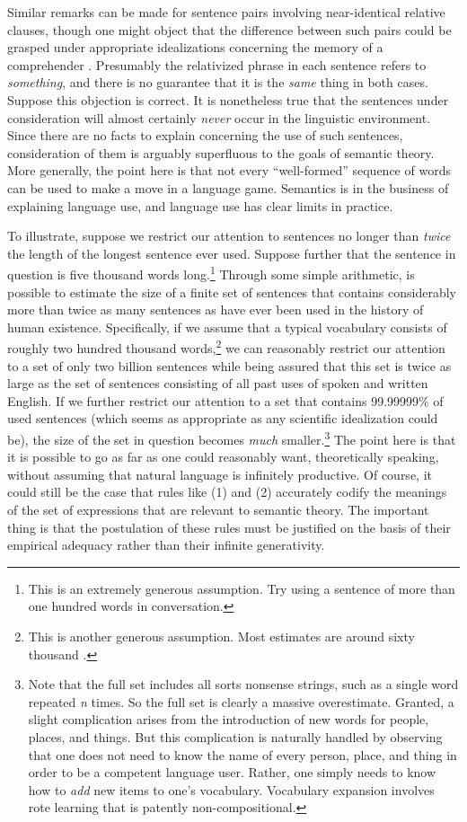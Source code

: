 Similar remarks can be made for sentence pairs involving near-identical relative clauses, though one might object that the difference between such pairs could be grasped under appropriate idealizations concerning the memory of a comprehender \citep{FodorPylyshyn:1988}. Presumably the relativized phrase in each sentence refers to \textit{something}, and there is no guarantee that it is the \textit{same} thing in both cases. Suppose this objection is correct. It is nonetheless true that the sentences under consideration will almost certainly \textit{never} occur in the linguistic environment. Since there are no facts to explain concerning the use of such sentences, consideration of them is arguably superfluous to the goals of semantic theory. More generally, the point here is that not every ``well-formed'' sequence of words can be used to make a move in a language game. Semantics is in the business of explaining language use, and language use has clear limits in practice.

To illustrate, suppose we restrict our attention to sentences no longer than \textit{twice} the length of the longest sentence ever used. Suppose further that the sentence in question is five thousand words long.\footnote{This is an extremely generous assumption. Try using a sentence of more than one hundred words in conversation.} Through some simple arithmetic, is possible to estimate the size of a finite set of sentences that contains considerably more than twice as many sentences as have ever been used in the history of human existence. Specifically, if we assume that a typical vocabulary consists of roughly two hundred thousand words,\footnote{This is another generous assumption. Most estimates are around sixty thousand \citep{Pinker:1994,Harley:2014}.} we can reasonably restrict our attention to a set of only two billion sentences while being assured that this set is twice as large as the set of sentences consisting of all past uses of spoken and written English. If we further restrict our attention to a set that contains 99.99999\% of used sentences (which seems as appropriate as any scientific idealization could be), the size of the set in question becomes \textit{much} smaller.\footnote{Note that the full set includes all sorts nonsense strings, such as a single word repeated \textit{n} times. So the full set is clearly a massive overestimate. Granted, a slight complication arises from the introduction of new words for people, places, and things. But this complication is naturally handled by observing that one does not need to know the name of every person, place, and thing in order to be a competent language user. Rather, one simply needs to know how to \textit{add} new items to one's vocabulary. Vocabulary expansion involves rote learning that is patently non-compositional.} The point here is that it is possible to go as far as one could reasonably want, theoretically speaking, without assuming that natural language is infinitely productive. Of course, it could still be the case that rules like (1) and (2) accurately codify the meanings of the set of expressions that are relevant to semantic theory. The important thing is that the postulation of these rules must be justified on the basis of their empirical adequacy rather than their infinite generativity. 

